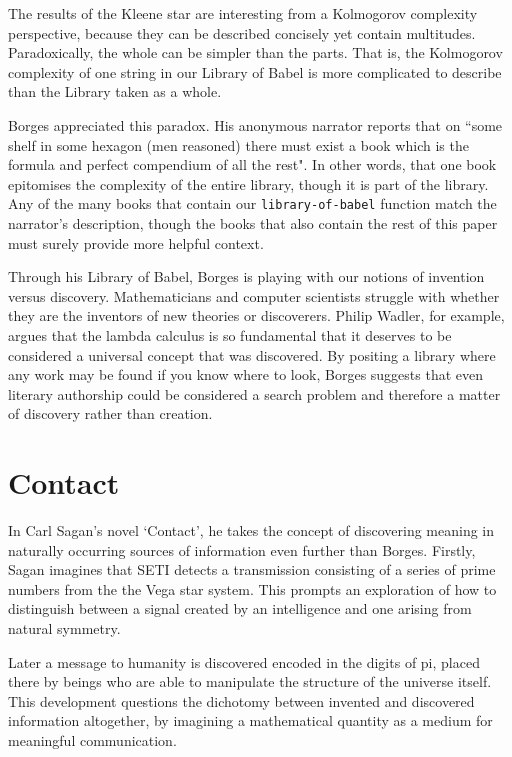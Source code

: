 \documentclass[numbers]{sigplanconf}
\begin{document}
The results of the Kleene star are interesting from a Kolmogorov complexity perspective, because they can be described
concisely yet contain multitudes. Paradoxically, the whole can be simpler than the parts.
That is, the Kolmogorov complexity of one string in our Library of Babel is more complicated to describe than the Library
taken as a whole.

Borges appreciated this paradox. His anonymous narrator reports that on ``some shelf in some hexagon (men reasoned)
there must exist a book which is the formula and perfect compendium of all the rest". In other words, that one book
epitomises the complexity of the entire library, though it is part of the library. Any of the many books that contain our
\verb|library-of-babel| function match the narrator's description, though the books that also contain the rest of this paper
must surely provide more helpful context.

Through his Library of Babel, Borges is playing with our notions of invention versus discovery. Mathematicians and computer
scientists struggle with whether they are the inventors of new theories or discoverers. Philip Wadler, for example,
argues that the lambda calculus is so fundamental that it deserves to be considered a universal concept that
was discovered\cite{Propositions as Types}. By positing a library where any work may be found if you know where to look, Borges
suggests that even literary authorship could be considered a search problem and therefore a matter of discovery rather than
creation.

\section{Contact}

In Carl Sagan's novel `Contact'\cite{Contact}, he takes the concept of discovering meaning in naturally occurring sources of
information even further than Borges. Firstly, Sagan imagines that SETI detects a transmission consisting of a series of prime
numbers from the the Vega star system. This prompts an exploration of how to distinguish between a signal created by an
intelligence and one arising from natural symmetry.

Later a message to humanity is discovered encoded in the digits of pi, placed there by beings who are able to manipulate the
structure of the universe itself. This development questions the dichotomy between invented and discovered information altogether,
by imagining a mathematical quantity as a medium for meaningful communication.
\end{document}
